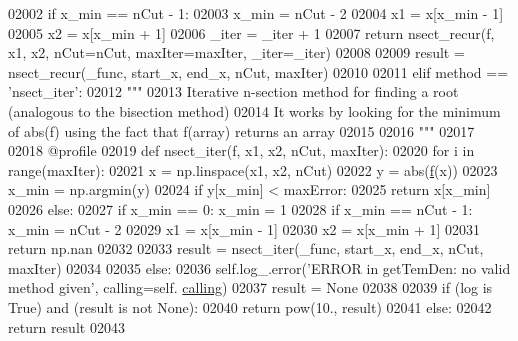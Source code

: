 \begin{DoxyCode}
02002                     \textcolor{keywordflow}{if} x\_min == nCut - 1:
02003                         x\_min = nCut - 2
02004                     x1 = x[x\_min - 1]
02005                     x2 = x[x\_min + 1]
02006                     \_iter = \_iter + 1
02007                     \textcolor{keywordflow}{return} nsect\_recur(f, x1, x2, nCut=nCut, maxIter=maxIter, \_iter=\_iter)
02008 
02009             result = nsect\_recur(\_func, start\_x, end\_x, nCut, maxIter)
02010 
02011         \textcolor{keywordflow}{elif} method == \textcolor{stringliteral}{'nsect\_iter'}:
02012             \textcolor{stringliteral}{"""}
02013 \textcolor{stringliteral}{            Iterative n-section method for finding a root (analogous to the bisection method)}
02014 \textcolor{stringliteral}{            It works by looking for the minimum of abs(f) using the fact that f(array) returns an array}
02015 \textcolor{stringliteral}{}
02016 \textcolor{stringliteral}{            """}
02017             
02018             @profile
02019             \textcolor{keyword}{def }nsect\_iter(f, x1, x2, nCut, maxIter):
02020                 \textcolor{keywordflow}{for} i \textcolor{keywordflow}{in} range(maxIter):
02021                     x = np.linspace(x1, x2, nCut)
02022                     y = abs(\hyperlink{namespacepyneb_1_1utils_1_1_fortran_format_af94352584eced016c14d524330879115}{f}(x))
02023                     x\_min = np.argmin(y)
02024                     \textcolor{keywordflow}{if} y[x\_min] < maxError:
02025                         \textcolor{keywordflow}{return} x[x\_min]
02026                     \textcolor{keywordflow}{else}:
02027                         \textcolor{keywordflow}{if} x\_min == 0: x\_min = 1
02028                         \textcolor{keywordflow}{if} x\_min == nCut - 1: x\_min = nCut - 2
02029                         x1 = x[x\_min - 1]
02030                         x2 = x[x\_min + 1]
02031                 \textcolor{keywordflow}{return} np.nan
02032 
02033             result = nsect\_iter(\_func, start\_x, end\_x, nCut, maxIter)
02034             
02035         \textcolor{keywordflow}{else}:
02036             self.log\_.error(\textcolor{stringliteral}{'ERROR in getTemDen: no valid method given'}, calling=self.
      \hyperlink{classpyneb_1_1core_1_1pynebcore_1_1_atom_a373b7735acf4f528b54bddf373ad67a1}{calling})
02037             result = \textcolor{keywordtype}{None}
02038 
02039         \textcolor{keywordflow}{if} (log \textcolor{keywordflow}{is} \textcolor{keyword}{True}) \textcolor{keywordflow}{and} (result \textcolor{keywordflow}{is} \textcolor{keywordflow}{not} \textcolor{keywordtype}{None}):
02040             \textcolor{keywordflow}{return} pow(10., result)
02041         \textcolor{keywordflow}{else}:
02042             \textcolor{keywordflow}{return} result
02043 

\end{DoxyCode}
